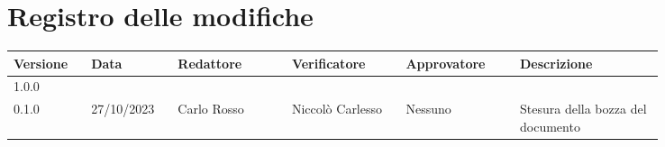 
\section*{Registro delle modifiche}
{
\renewcommand{\arraystretch}{1.5}
\scriptsize
\begin{tabular}{p{0.10\linewidth}p{0.10\linewidth}p{0.15\linewidth}p{0.15\linewidth}p{0.15\linewidth}p{0.19\linewidth}}
    \textbf{Versione}   & \textbf{Data} & \textbf{Redattore}     & \textbf{Verificatore} & \textbf{Approvatore}  & \textbf{Descrizione}  \\
    \hline
	1.0.0 \\
    \hline
	0.1.0 & 27/10/2023 & Carlo Rosso & Niccolò Carlesso & Nessuno & Stesura
	della bozza del documento \\
    \hline
\end{tabular}
}


